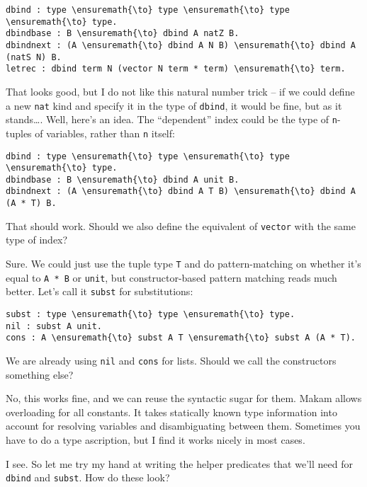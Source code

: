 \begin{verbatim}
dbind : type \ensuremath{\to} type \ensuremath{\to} type \ensuremath{\to} type. 
dbindbase : B \ensuremath{\to} dbind A natZ B.
dbindnext : (A \ensuremath{\to} dbind A N B) \ensuremath{\to} dbind A (natS N) B.
letrec : dbind term N (vector N term * term) \ensuremath{\to} term.
\end{verbatim}

\heroADVISOR{} That looks good, but I do not like this natural number trick --
if we could define a new \texttt{nat} kind and specify it in the type of
\texttt{dbind}, it would be fine, but as it stands\ldots{}. Well, here's
an idea. The ``dependent'' index could be the type of \texttt{n}-tuples
of variables, rather than \texttt{n} itself:

\begin{verbatim}
dbind : type \ensuremath{\to} type \ensuremath{\to} type \ensuremath{\to} type.
dbindbase : B \ensuremath{\to} dbind A unit B.
dbindnext : (A \ensuremath{\to} dbind A T B) \ensuremath{\to} dbind A (A * T) B.
\end{verbatim}

\heroSTUDENT{} That should work. Should we also define the equivalent of
\texttt{vector} with the same type of index?

\heroADVISOR{} Sure. We could just use the tuple type \texttt{T} and do
pattern-matching on whether it's equal to \texttt{A\ *\ B} or
\texttt{unit}, but constructor-based pattern matching reads much better.
Let's call it \texttt{subst} for substitutions:

\begin{verbatim}
subst : type \ensuremath{\to} type \ensuremath{\to} type.
nil : subst A unit.
cons : A \ensuremath{\to} subst A T \ensuremath{\to} subst A (A * T).
\end{verbatim}

\heroSTUDENT{} We are already using \texttt{nil} and \texttt{cons} for lists.
Should we call the constructors something else?

\heroADVISOR{} No, this works fine, and we can reuse the syntactic sugar for
them. Makam allows overloading for all constants. It takes statically
known type information into account for resolving variables and
disambiguating between them. Sometimes you have to do a type ascription,
but I find it works nicely in most cases.

\heroSTUDENT{} I see. So let me try my hand at writing the helper predicates
that we'll need for \texttt{dbind} and \texttt{subst}. How do these
look?

